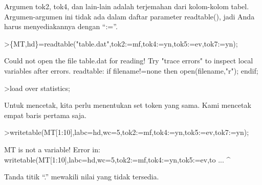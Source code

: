 \documentclass[a4paper,10pt]{article}
\begin{document}
\begin{eulernotebook}
\begin{eulercomment}
\begin{eulercomment}
\begin{eulercomment}
\begin{eulercomment}
\begin{eulercomment}
\begin{eulercomment}
\begin{eulercomment}
\begin{eulercomment}
\begin{eulercomment}
\begin{eulercomment}
\begin{eulercomment}
\begin{eulercomment}
\begin{eulercomment}
\begin{eulercomment}
\begin{eulercomment}
\begin{eulercomment}
\begin{eulercomment}
\begin{eulercomment}
\begin{eulercomment}
Argumen tok2, tok4, dan lain-lain adalah terjemahan dari kolom-kolom
tabel. Argumen-argumen ini tidak ada dalam daftar parameter
readtable(), jadi Anda harus menyediakannya dengan “:=”.
\end{eulercomment}
\begin{eulerprompt}
>\{MT,hd\}=readtable("table.dat",tok2:=mf,tok4:=yn,tok5:=ev,tok7:=yn);
\end{eulerprompt}
\begin{euleroutput}
  Could not open the file
  table.dat
  for reading!
  Try "trace errors" to inspect local variables after errors.
  readtable:
      if filename!=none then open(filename,"r"); endif;
\end{euleroutput}
\begin{eulerprompt}
>load over statistics;
\end{eulerprompt}
\begin{eulercomment}
Untuk mencetak, kita perlu menentukan set token yang sama. Kami
mencetak empat baris pertama saja.
\end{eulercomment}
\begin{eulerprompt}
>writetable(MT[1:10],labc=hd,wc=5,tok2:=mf,tok4:=yn,tok5:=ev,tok7:=yn);
\end{eulerprompt}
\begin{euleroutput}
  MT is not a variable!
  Error in:
  writetable(MT[1:10],labc=hd,wc=5,tok2:=mf,tok4:=yn,tok5:=ev,to ...
                     ^
\end{euleroutput}
\begin{eulercomment}
Tanda titik “.” mewakili nilai yang tidak tersedia.


\end{eulercomment}
\end{eulercomment}
\end{eulercomment}
\end{eulercomment}
\end{eulercomment}
\end{eulercomment}
\end{eulercomment}
\end{eulercomment}
\end{eulercomment}
\end{eulercomment}
\end{eulercomment}
\end{eulercomment}
\end{eulercomment}
\end{eulercomment}
\end{eulercomment}
\end{eulercomment}
\end{eulercomment}
\end{eulercomment}
\end{eulercomment}
\end{eulernotebook}
\end{document}
